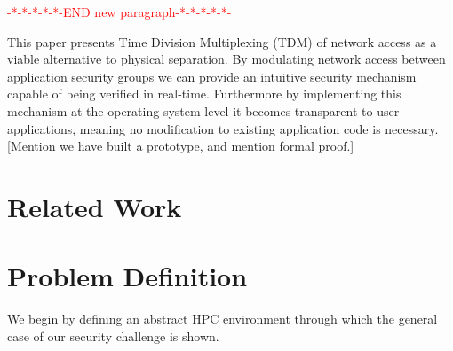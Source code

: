 \documentclass{llncs}
\begin{document}
\textcolor{red}{-*-*-*-*-*-END new paragraph-*-*-*-*-*-}

This paper presents Time Division Multiplexing (TDM) of network access as a viable alternative to physical separation. By modulating network access between application security groups we can provide an intuitive security mechanism capable of being verified in real-time. Furthermore by implementing this mechanism at the operating system level it becomes transparent to user applications, meaning no modification to existing application code is necessary. [Mention we have built a prototype, and mention formal proof.]
\section{Related Work}
\section{Problem Definition}

We begin by defining an abstract HPC environment through which the general case of our security challenge is shown.
\end{document}
